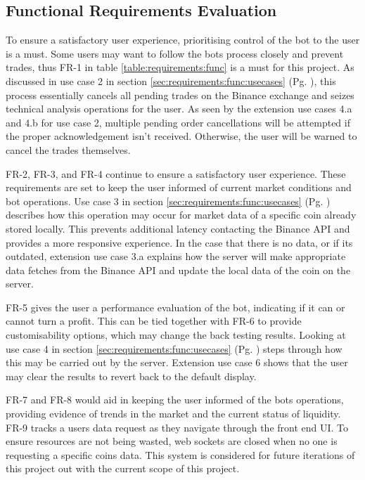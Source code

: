 \subsection{Functional Requirements Evaluation}
\noindent 

\noindent To ensure a satisfactory user experience, prioritising control of the bot to the user is a must. Some users may want to follow the bots process closely and prevent trades, thus FR-1 in table \ref{table:requirements:func} is a must for this project. As discussed in use case 2 in section \ref{sec:requirements:func:usecases} (Pg. \pageref{sec:requirements:func:usecases:2}), this process essentially cancels all pending trades on the Binance exchange and seizes technical analysis operations for the user. As seen by the extension use cases 4.a and 4.b for use case 2, multiple pending order cancellations will be attempted if the proper acknowledgement isn't received. Otherwise, the user will be warned to cancel the trades themselves.

FR-2, FR-3, and FR-4 continue to ensure a satisfactory user experience. These requirements are set to keep the user informed of current market conditions and bot operations. Use case 3 in section \ref{sec:requirements:func:usecases} (Pg. \pageref{sec:requirements:func:usecases:3}) describes how this operation may occur for market data of a specific coin already stored locally. This prevents additional latency contacting the Binance API and provides a more responsive experience. In the case that there is no data, or if its outdated, extension use case 3.a explains how the server will make appropriate data fetches from the Binance API and update the local data of the coin on the server.

FR-5 gives the user a performance evaluation of the bot, indicating if it can or cannot turn a profit. This can be tied together with FR-6 to provide customisability options, which may change the back testing results. Looking at use case 4 in section \ref{sec:requirements:func:usecases} (Pg. \pageref{sec:requirements:func:usecases:4}) steps through how this may be carried out by the server. Extension use case 6 shows that the user may clear the results to revert back to the default display. 

FR-7 and FR-8 would aid in keeping the user informed of the bots operations, providing evidence of trends in the market and the current status of liquidity. FR-9 tracks a users data request as they navigate through the front end UI. To ensure resources are not being wasted, web sockets are closed when no one is requesting a specific coins data. This system is considered for future iterations of this project out with the current scope of this project.  

